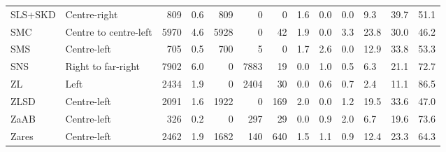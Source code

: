 \begin{tabular}{llrlrrrllllll}
SLS+SKD & Centre-right & 809 & 0.6 & 809 & 0 & 0 & 1.6 & 0.0 & 0.0 & 9.3 & 39.7 & 51.1 \\
SMC & Centre to centre-left & 5970 & 4.6 & 5928 & 0 & 42 & 1.9 & 0.0 & 3.3 & 23.8 & 30.0 & 46.2 \\
SMS & Centre-left & 705 & 0.5 & 700 & 5 & 0 & 1.7 & 2.6 & 0.0 & 12.9 & 33.8 & 53.3 \\
SNS & Right to far-right & 7902 & 6.0 & 0 & 7883 & 19 & 0.0 & 1.0 & 0.5 & 6.3 & 21.1 & 72.7 \\
ZL & Left & 2434 & 1.9 & 0 & 2404 & 30 & 0.0 & 0.6 & 0.7 & 2.4 & 11.1 & 86.5 \\
ZLSD & Centre-left & 2091 & 1.6 & 1922 & 0 & 169 & 2.0 & 0.0 & 1.2 & 19.5 & 33.6 & 47.0 \\
ZaAB & Centre-left & 326 & 0.2 & 0 & 297 & 29 & 0.0 & 0.9 & 2.0 & 6.7 & 19.6 & 73.6 \\
Zares & Centre-left & 2462 & 1.9 & 1682 & 140 & 640 & 1.5 & 1.1 & 0.9 & 12.4 & 23.3 & 64.3 \\
\bottomrule
\end{tabular}
